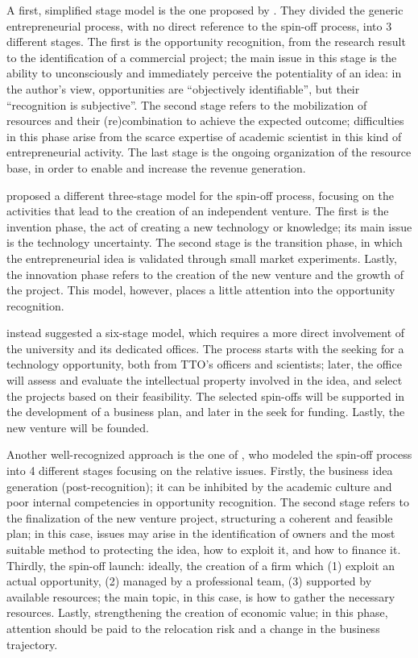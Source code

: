 A first, simplified stage model is the one proposed by \citet{Druilhe2004}. They divided the generic entrepreneurial process, with no direct reference to the spin-off process, into 3 different stages. The first is the opportunity recognition, from the research result to the identification of a commercial project; the main issue in this stage is the ability to unconsciously and immediately perceive the potentiality of an idea: in the author's view, opportunities are \enquote{objectively identifiable}, but their \enquote{recognition is subjective}. The second stage refers to the mobilization of resources and their (re)combination to achieve the expected outcome; difficulties in this phase arise from the scarce expertise of academic scientist in this kind of entrepreneurial activity. The last stage is the ongoing organization of the resource base, in order to enable and increase the revenue generation.

\citet{Clarysse2005} proposed a different three-stage model for the spin-off process, focusing on the activities that lead to the creation of an independent venture. The first is the invention phase, the act of creating a new technology or knowledge; its main issue is the technology uncertainty. The second stage is the transition phase, in which the entrepreneurial idea is validated through small market experiments. Lastly, the innovation phase refers to the creation of the new venture and the growth of the project. This model, however, places a little attention into the opportunity recognition.

\citet{Degroof2002} instead suggested a six-stage model, which requires a more direct involvement of the university and its dedicated offices. The process starts with the seeking for a technology opportunity, both from TTO's officers and scientists; later, the office will assess and evaluate the intellectual property involved in the idea, and select the projects based on their feasibility. The selected spin-offs will be supported in the development of a business plan, and later in the seek for funding. Lastly, the new venture will be founded.

Another well-recognized approach is the one of \citet{Ndonzuau2002}, who modeled the spin-off process into 4 different stages focusing on the relative issues. Firstly, the business idea generation (post-recognition); it can be inhibited by the academic culture and poor internal competencies in opportunity recognition. The second stage refers to the finalization of the new venture project, structuring a coherent and feasible plan; in this case, issues may arise in the identification of owners and the most suitable method to protecting the idea, how to exploit it, and how to finance it. Thirdly, the spin-off launch: ideally, the creation of a firm which (1) exploit an actual opportunity, (2) managed by a professional team, (3) supported by available resources; the main topic, in this case, is how to gather the necessary resources. Lastly, strengthening the creation of economic value; in this phase, attention should be paid to the relocation risk and a change in the business trajectory.

